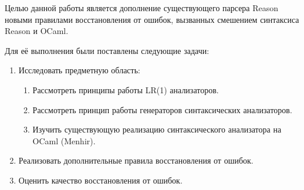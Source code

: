 Целью данной работы является дополнение существующего парсера Reason новыми правилами восстановления от ошибок, вызванных смешением синтаксиса Reason и OCaml.

Для её выполнения были поставлены следующие задачи:
 \begin{enumerate}
 \item Исследовать предметную область:
 \begin{enumerate} 
 	\item Рассмотреть принципы работы LR(1) анализаторов.
	\item Рассмотреть принцип работы генераторов синтаксических анализаторов.
 	\item Изучить существующую реализацию синтаксического анализатора на OCaml (Menhir).
 \end{enumerate}
 \item Реализовать дополнительные правила восстановления от ошибок.
 \item Оценить качество восстановления от ошибок.
 
 \end{enumerate}